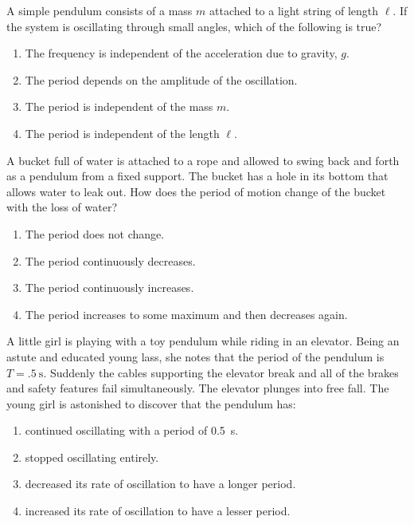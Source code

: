 \begin{example}
  A simple pendulum consists of a mass $m$ attached to a light string of length
  $\ell$. If the system is oscillating through small angles, which of the
  following is true?
  \begin{enumerate}[nosep]
  \item The frequency is independent of the acceleration due to gravity, $g$.
  \item The period depends on the amplitude of the oscillation.
  \item The period is independent of the mass $m$.
  \item The period is independent of the length $\ell$.
  \end{enumerate}
\end{example}

\begin{example}
  A bucket full of water is attached to a rope and allowed to swing back and
  forth as a pendulum from a fixed support. The bucket has a hole in its
  bottom that allows water to leak out. How does the period of motion change of
  the bucket with the loss of water?
  \begin{enumerate}[nosep]
  \item The period does not change.
  \item The period continuously decreases.
  \item The period continuously increases.
  \item The period increases to some maximum and then decreases again.
  \end{enumerate}
\end{example}

\begin{example}
  A little girl is playing with a toy pendulum while riding in an elevator.
  Being an astute and educated young lass, she notes that the period of the
  pendulum is $T=\SI{.5}\second$. Suddenly the cables supporting the elevator
  break and all  of the brakes and safety features fail simultaneously. The
  elevator plunges into free fall. The young girl is astonished to discover
  that the pendulum has:
  \begin{enumerate}[nosep]
  \item continued oscillating with a period of \SI{.5}\second.
  \item stopped oscillating entirely.
  \item decreased its rate of oscillation to have a longer period.
  \item increased its rate of oscillation to have a lesser period.
  \end{enumerate}
\end{example}



